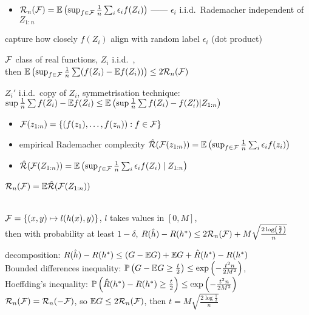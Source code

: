 \begin{itemize}
    \item $\mathcal{R}_n(\mathcal{F}) = \mathbb{E} \left( \sup_{f \in \mathcal{F}} \frac{1}{n} \sum_i \epsilon_i f(Z_i) \right)$ ------ $\epsilon_i$ i.i.d.\ Rademacher independent of $Z_{1:n}$
\end{itemize}
\begin{intuition}
    capture how closely $f(Z_i)$ align with random label $\epsilon_i$ (dot product)
\end{intuition}
\begin{thm}
    $\mathcal{F}$ class of real functions, $Z_i$ i.i.d.\ ,\\ then $\mathbb{E} \left( \sup_{f \in \mathcal{F}} \frac{1}{n} \sum (f(Z_i) - \mathbb{E} f(Z_i)) \right) \leq 2 \mathcal{R}_n(\mathcal{F})$
\end{thm}
\begin{pf}
    $Z_i'$ i.i.d.\ copy of $Z_i$, symmetrisation technique: \\
    $\sup \frac{1}{n} \sum f(Z_i) - \mathbb{E} f(Z_i) \leq \mathbb{E}\left( \sup \frac{1}{n} \sum f(Z_i) - f(Z_i') | Z_{1:n} \right)$
\end{pf}

\begin{itemize}
    \item $\mathcal{F}(z_{1:n}) = \left\{ (f(z_1), \dots, f(z_n)) : f \in \mathcal{F} \right\}$
    \item empirical Rademacher complexity $\hat {\mathcal{R}}(\mathcal{F}(z_{1:n})) = \mathbb{E} \left( \sup_{f \in \mathcal{F}} \frac{1}{n} \sum_i \epsilon_i f(z_i) \right)$
    \item $\hat {\mathcal{R}}(\mathcal{F}(Z_{1:n})) = \mathbb{E} \left( \sup_{f \in \mathcal{F}} \frac{1}{n} \sum_i \epsilon_i f(Z_i) \mid Z_{1:n}\right)$
\end{itemize}

\begin{fact}
    $\mathcal{R}_n(\mathcal{F}) = \mathbb{E} \hat {\mathcal{R}}(\mathcal{F}(Z_{1:n}))$
\end{fact}

\begin{thm}
    \,\\$\mathcal{F} = \left\{ (x, y) \mapsto l(h(x), y) \right\}$, $l$ takes values in $[0, M]$, \\
    then with probability at least $1 - \delta$, $R(\hat{h}) - R(h^*) \leq 2\mathcal{R}_n(\mathcal{F}) + M \sqrt{\frac{2 \log(\frac{2}{\delta})}{n}}$
\end{thm}
\begin{pf}
    decomposition: $R(\hat h) - R(h^*) \leq (G - \mathbb{E} G) + \mathbb{E} G + \hat R(h^*) - R(h^*)$\\
    Bounded differences inequality: $\mathbb{P}\left(G - \mathbb{E} G \geq \frac{t}{2}\right) \leq \exp\left(-\frac{t^2 n}{2M^2}\right)$,\\
    Hoeffding's inequality: $\mathbb{P}\left(\hat R(h^*) - R(h^*) \geq \frac{t}{2}\right) \leq \exp\left(-\frac{t^2 n}{2M^2}\right)$\\
    $\mathcal{R}_n(\mathcal{F}) = \mathcal{R}_n(-\mathcal{F})$, so $\mathbb{E} G \leq 2 \mathcal{R}_n (\mathcal{F})$, then $t= M\sqrt{\frac{2\log \frac{1}{\delta}}{n}}$
\end{pf}

